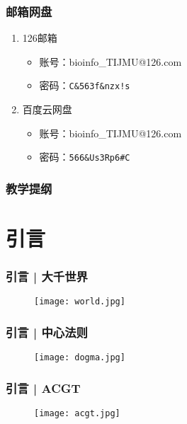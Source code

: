 \begin{frame}
	\frametitle{邮箱网盘}
		\begin{enumerate}
			\item 126邮箱
				\begin{itemize}
					\item 账号：bioinfo\_TIJMU@126.com
					\item 密码：\texttt{C\&563f\&nzx!s}
				\end{itemize}
			\item 百度云网盘
				\begin{itemize}
					\item 账号：bioinfo\_TIJMU@126.com
					\item 密码：\texttt{566\&Us3Rp6\#C}
				\end{itemize}
		\end{enumerate}
\end{frame}

\begin{frame}
  \titlepage
\end{frame}

\begin{frame}[plain]
  \frametitle{教学提纲}
  \setcounter{tocdepth}{2}
  \begin{multicols}{2}
  \tableofcontents
  \end{multicols}
\end{frame}

\section{引言}
\begin{frame}
	\frametitle{引言 | 大千世界}
	\begin{figure}
		\centering
		\texttt{[image: world.jpg]}
	\end{figure}
\end{frame}

\begin{frame}
	\frametitle{引言 | 中心法则}
	\begin{figure}
		\centering
		\texttt{[image: dogma.jpg]}
	\end{figure}
\end{frame}

\begin{frame}
	\frametitle{引言 | ACGT}
	\begin{figure}
		\centering
		\texttt{[image: acgt.jpg]}
	\end{figure}
\end{frame}

